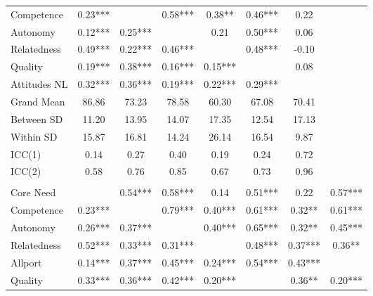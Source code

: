 \begin{table}
\begin{minipage}[t][\textheight][t]{\textwidth}
{\begin{tabular}[t]{lccccccc}
\hspace{1em}Competence & 0.23*** &  & 0.58*** & 0.38** & 0.46*** & 0.22 & \\
\hspace{1em}Autonomy & 0.12*** & 0.25*** &  & 0.21 & 0.50*** & 0.06 & \\
\hspace{1em}Relatedness & 0.49*** & 0.22*** & 0.46*** &  & 0.48*** & -0.10 & \\
\hspace{1em}Quality & 0.19*** & 0.38*** & 0.16*** & 0.15*** &  & 0.08 & \\
\hspace{1em}Attitudes NL & 0.32*** & 0.36*** & 0.19*** & 0.22*** & 0.29*** &  & \\
\addlinespace
\hspace{1em}Grand Mean & 86.86 & 73.23 & 78.58 & 60.30 & 67.08 & 70.41 & \\
\hspace{1em}Between SD & 11.20 & 13.95 & 14.07 & 17.35 & 12.54 & 17.13 & \\
\hspace{1em}Within SD & 15.87 & 16.81 & 14.24 & 26.14 & 16.54 & 9.87 & \\
\hspace{1em}ICC(1) & 0.14 & 0.27 & 0.40 & 0.19 & 0.24 & 0.72 & \\
\hspace{1em}ICC(2) & 0.58 & 0.76 & 0.85 & 0.67 & 0.73 & 0.96 & \\
\addlinespace[0.3em]
\multicolumn{8}{l}{\textbf{Study 3}}\\
\hspace{1em}Core Need &  & 0.54*** & 0.58*** & 0.14 & 0.51*** & 0.22 & 0.57***\\
\hspace{1em}Competence & 0.23*** &  & 0.79*** & 0.40*** & 0.61*** & 0.32** & 0.61***\\
\hspace{1em}Autonomy & 0.26*** & 0.37*** &  & 0.40*** & 0.65*** & 0.32** & 0.45***\\
\hspace{1em}Relatedness & 0.52*** & 0.33*** & 0.31*** &  & 0.48*** & 0.37*** & 0.36**\\
\hspace{1em}Allport & 0.14*** & 0.37*** & 0.45*** & 0.24*** & 0.54*** & 0.43*** & \\
\hspace{1em}Quality & 0.33*** & 0.36*** & 0.42*** & 0.20*** &  & 0.36** & 0.20***\\

\end{tabular}}
\end{minipage}
\end{table}
